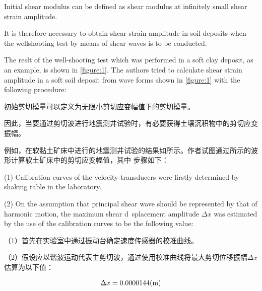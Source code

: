 
\begin{paracol}{2}
    
    Initial shear modulus can be defined as shear modulus at infinitely small shear strain amplitude.
    
    It is therefore necessary to obtain shear strain amplitude in soil deposits when the wellshooting test by means of shear waves is to be conducted.
    
    The reslt of the well-shooting test which was performed in a soft clay deposit, as an example, is shown in \autoref{figure:1}. The authors tried to calculate shear strain amplitude in a soft soil deposit from wave forms shown in \autoref{figure:1} with the following procedure: 

    \switchcolumn

    初始剪切模量可以定义为无限小剪切应变幅值下的剪切模量。
    
    因此，当要通过剪切波进行地震测井试验时，有必要获得土壤沉积物中的剪切应变振幅。
            
    例如，在软黏土矿床中进行的地震测井试验的结果如所示。作者试图通过所示的波形计算软土矿床中的剪切应变幅值，其中 步骤如下：

\end{paracol}



\begin{paracol}{2}
    
    (1) Calibration curves of the velocity transducers were firstly determined by shaking table in the laboratory.
    
    (2) On the assumption that principal shear wave should be represented by that of harmonic motion, the maximum shear d~splacement amplitude $\Delta{}x$ was estimated by the use of the calibration curves to be the following value:

    \switchcolumn
    
    （1）首先在实验室中通过振动台确定速度传感器的校准曲线。
            
    （2）假设应以谐波运动代表主剪切波，通过使用校准曲线将最大剪切位移振幅$\Delta{}x$估算为以下值：

\end{paracol}

\begin{align}
    \Delta{}x=0.0000144(\rm{m})
    \label{equation:2}
\end{align}

